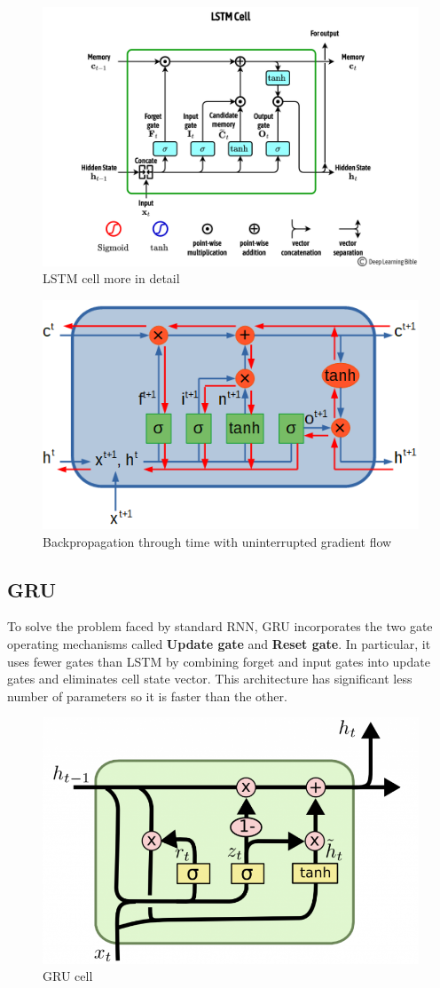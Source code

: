 \begin{figure}[!ht]
    \centering
    \includegraphics[width=0.6\linewidth]{img/RNN/LSTM_2.png}
    \caption{LSTM cell more in detail}
    \label{fig:lstm2}
\end{figure}

\begin{figure}[!ht]
    \centering
    \includegraphics[width=0.5\linewidth]{img/RNN/backprop.png}
    \caption{Backpropagation through time with uninterrupted gradient flow}
    \label{fig:RNNBack}
\end{figure}
\subsection{GRU}
To solve the problem faced by standard RNN, GRU incorporates the two gate operating mechanisms called
\textbf{Update gate} and \textbf{Reset gate}. In particular, it uses fewer gates than LSTM by combining 
forget and input gates into update gates and eliminates cell state vector. This architecture has 
significant less number of parameters so it is faster than the other.
 
\begin{figure}[!ht]
    \centering
    \includegraphics[width=0.5\linewidth]{img/RNN/GRU.png}
    \caption{GRU cell}
    \label{fig:gru}
\end{figure}

